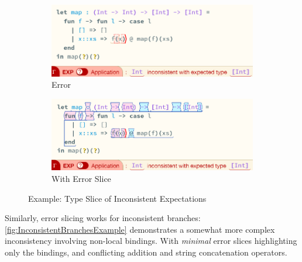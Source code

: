\begin{figure}[h]
\centering
\begin{subfigure}{0.49\textwidth}
\centering
\includegraphics[width=1\textwidth]{Media/Figures/map_example}
\caption{Error}
\end{subfigure}
\begin{subfigure}{0.49\textwidth}
\centering
\includegraphics[width=1\textwidth]{Media/Figures/map_example_sliced}
\caption{With Error Slice}
\end{subfigure}
\caption{Example: Type Slice of Inconsistent Expectations}
\label{fig:MapExample}
\end{figure}

Similarly, error slicing works for inconsistent branches: \cref{fig:InconsistentBranchesExample} demonstrates a somewhat more complex inconsistency involving non-local bindings. With \textit{minimal} error slices highlighting only the bindings, and conflicting addition and string concatenation operators.

